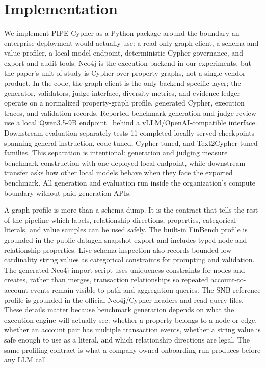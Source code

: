\documentclass[11pt]{article}
\begin{document}
\section{Implementation}
We implement PIPE-Cypher as a Python package around the boundary an enterprise deployment would actually use: a read-only graph client, a schema and value profiler, a local model endpoint, deterministic Cypher governance, and export and audit tools. Neo4j is the execution backend in our experiments, but the paper's unit of study is Cypher over property graphs, not a single vendor product. In the code, the graph client is the only backend-specific layer; the generator, validators, judge interface, diversity metrics, and evidence ledger operate on a normalized property-graph profile, generated Cypher, execution traces, and validation records. Reported benchmark generation and judge review use a local Qwen3.5-9B endpoint~\citep{qwen2026qwen35hf} behind a vLLM/OpenAI-compatible interface. Downstream evaluation separately tests 11 completed locally served checkpoints spanning general instruction, code-tuned, Cypher-tuned, and Text2Cypher-tuned families. This separation is intentional: generation and judging measure benchmark construction with one deployed local endpoint, while downstream transfer asks how other local models behave when they face the exported benchmark. All generation and evaluation run inside the organization's compute boundary without paid generation APIs.

A graph profile is more than a schema dump. It is the contract that tells the rest of the pipeline which labels, relationship directions, properties, categorical literals, and value samples can be used safely. The built-in FinBench profile is grounded in the public datagen snapshot export and includes typed node and relationship properties. Live schema inspection also records bounded low-cardinality string values as categorical constraints for prompting and validation. The generated Neo4j import script uses uniqueness constraints for nodes and creates, rather than merges, transaction relationships so repeated account-to-account events remain visible to path and aggregation queries. The SNB reference profile is grounded in the official Neo4j/Cypher headers and read-query files. These details matter because benchmark generation depends on what the execution engine will actually see: whether a property belongs to a node or edge, whether an account pair has multiple transaction events, whether a string value is safe enough to use as a literal, and which relationship directions are legal. The same profiling contract is what a company-owned onboarding run produces before any LLM call.
\end{document}
